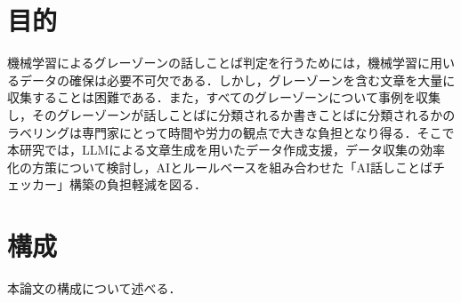 \section{目的}
機械学習によるグレーゾーンの話しことば判定を行うためには，機械学習に用いるデータの確保は必要不可欠である．しかし，グレーゾーンを含む文章を大量に収集することは困難である．また，すべてのグレーゾーンについて事例を収集し，そのグレーゾーンが話しことばに分類されるか書きことばに分類されるかのラベリングは専門家にとって時間や労力の観点で大きな負担となり得る．そこで本研究では，LLMによる文章生成を用いたデータ作成支援，データ収集の効率化の方策について検討し，AIとルールベースを組み合わせた「AI話しことばチェッカー」構築の負担軽減を図る．

\section{構成}
本論文の構成について述べる．
